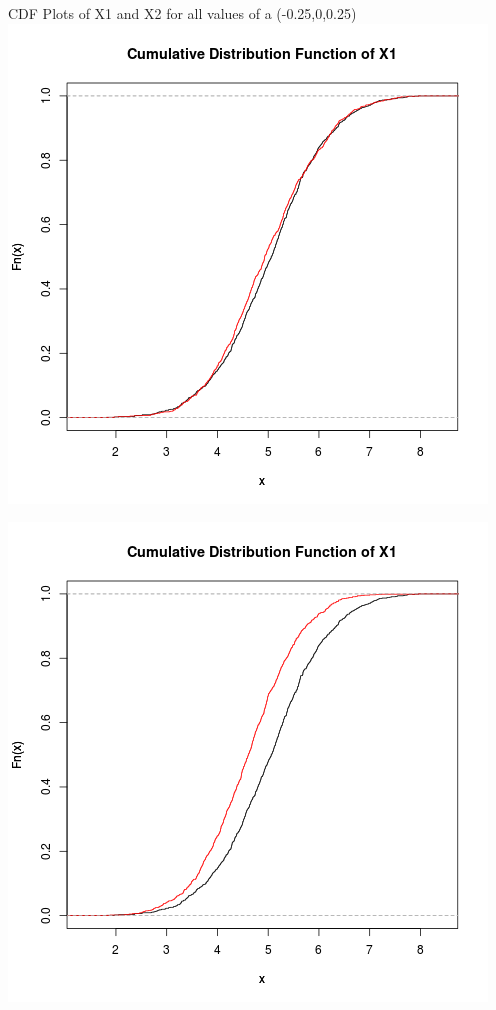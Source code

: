 \documentclass{article}
\begin{document}
CDF Plots of X1 and X2 for all values of a (-0.25,0,0.25)\\
\includegraphics{"plot2_1"}
\pagebreak

\includegraphics{"plot2_2"}
\pagebreak
\end{document}
